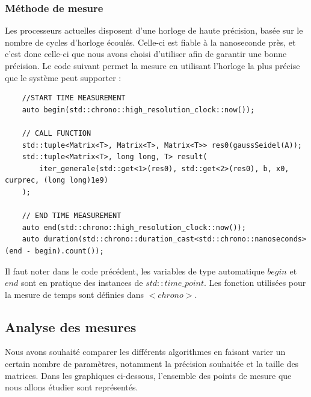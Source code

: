 \subsubsection{Méthode de mesure}
Les processeurs actuelles disposent d'une horloge de haute précision, basée sur le nombre de cycles d'horloge écoulés. Celle-ci est fiable à la nanoseconde près, et c'est donc celle-ci que nous avons choisi d'utiliser afin de garantir une bonne précision. Le code suivant permet la mesure en utilisant l'horloge la plus précise que le système peut supporter :

\begin{verbatim}
	//START TIME MEASUREMENT
	auto begin(std::chrono::high_resolution_clock::now());
	
	// CALL FUNCTION
	std::tuple<Matrix<T>, Matrix<T>, Matrix<T>> res0(gaussSeidel(A));
	std::tuple<Matrix<T>, long long, T> result(
		iter_generale(std::get<1>(res0), std::get<2>(res0), b, x0, curprec, (long long)1e9)
	);
	
	// END TIME MEASUREMENT
	auto end(std::chrono::high_resolution_clock::now());
	auto duration(std::chrono::duration_cast<std::chrono::nanoseconds>(end - begin).count());

\end{verbatim}

Il faut noter dans le code précédent, les variables de type automatique $begin$ et $end$ sont en pratique des instances de $std::time\_point$. Les fonction utilisées pour la mesure de temps sont définies dans $<chrono>$.\\



\subsection{Analyse des mesures}


Nous avons souhaité comparer les différents algorithmes en faisant varier un certain nombre de paramètres, notamment la précision souhaitée et la taille des matrices. Dans les graphiques ci-dessous, l'ensemble des points de mesure que nous allons étudier sont représentés.


